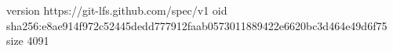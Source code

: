 version https://git-lfs.github.com/spec/v1
oid sha256:e8ae914f972c52445dedd777912faab0573011889422e6620bc3d464e49d6f75
size 4091

